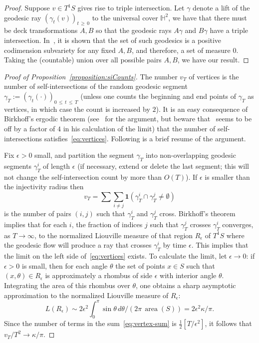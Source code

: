 \documentclass[AHL, Unicode, longabstracts, published]{cedram}
\DeclareMathOperator{\area}{area}
\begin{document}
\begin{proof}
Suppose $v \in T^1S$ gives rise to triple intersection. Let $\gamma$ denote a lift of the geodesic ray $(\gamma_{t} (v))_{t\,\geq\,0}$ to the universal cover $\mathbb H^2$, we have that there must be deck transformations $A, B$ so that the geodesic rays $A\gamma$ and $B\gamma$ have a triple intersection. In~\cite{Epstein}, it is shown that the set of such geodesics is a positive codimension subvariety for any fixed $A, B$, and therefore, a set of measure $0$. Taking the (countable) union over all possible pairs $A, B$, we have our result.
\end{proof}



\begin{proof}[Proof of Proposition~\ref{proposition:siCounts}]
The number $v_{T}$ of vertices is the number of self-intersections of the random geodesic segment $\gamma_{T}:= (\gamma_{t} (\cdot))_{0\,\leq\,t\,\leq\,T}$ (unless one counts the beginning and end points of $\gamma_{T}$ as vertices, in which case the count is increased by $2$). It is an easy consequence of Birkhoff's ergodic theorem (see~\cite[Section~2.3]{lalley:duke} for the argument, but beware that~\cite{lalley:duke} seems to be off by a factor of $4$ in his calculation of the limit) that the number of self-intersections satisfies~\eqref{eq:vertices}. Following is a brief resume of the argument.

Fix $\epsilon >0$ small, and partition the segment $\gamma_{T}$ into non-overlapping geodesic segments $\gamma^{i}_{T}$ of length $\epsilon$ (if necessary, extend or delete the last segment; this will not change the self-intersection count by more than $O (T)$). If $\epsilon$ is smaller than the injectivity radius then
\begin{equation}\label{eq:vertex-sum}
v_{T}=\sum \sum_{i\not =j} \mathbf{1} \left(\gamma^{i}_{T}\cap\gamma^{j}_{T}\not =\emptyset\right)
\end{equation}
is the number of pairs $(i,j)$ such that $\gamma^{i}_{T}$ and $\gamma^{j}_{T}$ cross. Birkhoff's theorem implies that for each $i$, the fraction of indices $j$ such that $\gamma^{j}_{T}$ crosses $\gamma^{i}_{T}$ converges, as $T \rightarrow \infty$, to the normalized Liouville measure of that region $R_{\epsilon}$ of $T^1S$ where the geodesic flow will produce a ray that crosses $\gamma^{i}_{T}$ by time $\epsilon$. This implies that the limit on the left side of~\eqref{eq:vertices} exists. To calculate the limit, let $\epsilon \rightarrow 0$: if $\epsilon >0$ is small, then for each angle $\theta$ the set of points $x\in S$ such that $(x,\theta)\in R_{\epsilon}$ is approximately a rhombus of side $\epsilon$ with interior angle $\theta$. Integrating the area of this rhombus over $\theta$, one obtains a sharp asymptotic approximation to the normalized Liouville measure of $R_{\epsilon}$:
\[
L (R_{\epsilon})\sim 2\epsilon^{2}\int_{0}^{\pi} \sin \theta
\,d\theta / (2\pi \,\area (S))=2\epsilon^{2} \kappa/\pi.
\]
Since the number of terms in the sum~\eqref{eq:vertex-sum} is $\frac{1}{2} [T/\epsilon^{2}]$, it follows that $v_{T}/T^{2}\rightarrow \kappa/\pi$.



\end{proof}
\end{document}
